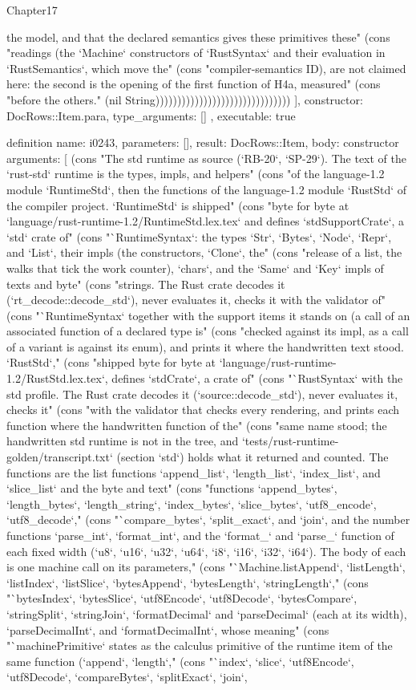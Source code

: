 \begin{lexlean}{Chapter17}
\begin{semanticmodule}
{{the model, and that the declared semantics gives these primitives these" (cons "readings (the `Machine` constructors of `RustSyntax` and their evaluation in `RustSemantics`, which move the" (cons "compiler-semantics ID), are not claimed here: the second is the opening of the first function of H4a, measured" (cons "before the others." (nil String)))))))))))))))))))))))))))))))
    ],
    constructor: DocRows::Item.para,
    type_arguments: []
  },
  executable: true
}

definition{
  name: i0243,
  parameters: [],
  result: DocRows::Item,
  body: constructor{
    arguments: [
      (cons "The std runtime as source (`RB-20`, `SP-29`). The text of the `rust-std` runtime is the types, impls, and helpers" (cons "of the language-1.2 module `RuntimeStd`, then the functions of the language-1.2 module `RustStd` of the compiler project. `RuntimeStd` is shipped" (cons "byte for byte at `language/rust-runtime-1.2/RuntimeStd.lex.tex` and defines `stdSupportCrate`, a `std` crate of" (cons "`RuntimeSyntax`: the types `Str`, `Bytes`, `Node`, `Repr`, and `List`, their impls (the constructors, `Clone`, the" (cons "release of a list, the walks that tick the work counter), `chars`, and the `Same` and `Key` impls of texts and byte" (cons "strings. The Rust crate decodes it (`rt_decode::decode_std`), never evaluates it, checks it with the validator of" (cons "`RuntimeSyntax` together with the support items it stands on (a call of an associated function of a declared type is" (cons "checked against its impl, as a call of a variant is against its enum), and prints it where the handwritten text stood. `RustStd`," (cons "shipped byte for byte at `language/rust-runtime-1.2/RustStd.lex.tex`, defines `stdCrate`, a crate of" (cons "`RustSyntax` with the std profile. The Rust crate decodes it (`source::decode_std`), never evaluates it, checks it" (cons "with the validator that checks every rendering, and prints each function where the handwritten function of the" (cons "same name stood; the handwritten std runtime is not in the tree, and `tests/rust-runtime-golden/transcript.txt` (section `std`) holds what it returned and counted. The functions are the list functions `append_list`, `length_list`, `index_list`, and `slice_list` and the byte and text" (cons "functions `append_bytes`, `length_bytes`, `length_string`, `index_bytes`, `slice_bytes`, `utf8_encode`, `utf8_decode`," (cons "`compare_bytes`, `split_exact`, and `join`, and the number functions `parse_int`, `format_int`, and the `format_` and `parse_` function of each fixed width (`u8`, `u16`, `u32`, `u64`, `i8`, `i16`, `i32`, `i64`). The body of each is one machine call on its parameters," (cons "`Machine.listAppend`, `listLength`, `listIndex`, `listSlice`, `bytesAppend`, `bytesLength`, `stringLength`," (cons "`bytesIndex`, `bytesSlice`, `utf8Encode`, `utf8Decode`, `bytesCompare`, `stringSplit`, `stringJoin`, `formatDecimal` and `parseDecimal` (each at its width), `parseDecimalInt`, and `formatDecimalInt`, whose meaning" (cons "`machinePrimitive` states as the calculus primitive of the runtime item of the same function (`append`, `length`," (cons "`index`, `slice`, `utf8Encode`, `utf8Decode`, `compareBytes`, `splitExact`, `join`, }}
\end{semanticmodule}
\end{lexlean}

